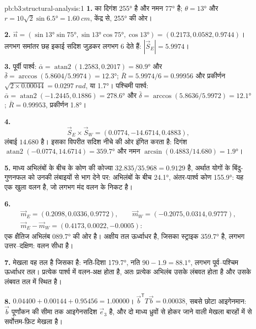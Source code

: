 \begin{solution}{pb:b3:structural-analysis:1}
\textbf{1.}  का दिगंश \ang{255} है और नमन \ang{77} है; $\theta =
\ang{13}$ और $r = 10\sqrt2\sin\ang{6.5} = \qty{1.60}{cm}$, केंद्र से,
\ang{255} की ओर।

\textbf{2.} $\vec n = (\sin\ang{13}\sin\ang{75}, \sin\ang{13}\cos\ang{75},
\cos\ang{13}) = (0.2173, 0.0582, 0.9744)$। लगभग समांतर छह इकाई सदिश
जुड़कर लगभग 6 देते हैं: $|\vec S_E| = 5.9974$।

\textbf{3.} पूर्वी पार्श्व: $\bar\alpha = \operatorname{atan2}(1.2583, 0.2017) =
\ang{80.9}$ और $\bar\delta = \arccos(5.8604/5.9974) = \ang{12.3}$; $\bar R
= 5.9974/6 = 0.99956$ और प्रकीर्णन $\sqrt{2\times0.00044} =
\qty{0.0297}{rad}$, या \ang{1.7}। पश्चिमी पार्श्व: $\bar\alpha =
\operatorname{atan2}(-1.2445, 0.1886) = \ang{278.6}$ और $\bar\delta =
\arccos(5.8636/5.9972) = \ang{12.1}$; $\bar R = 0.99953$, प्रकीर्णन \ang{1.8}।

\textbf{4.}
\[
  \vec S_E\times\vec S_W = (0.0774, -14.6714, 0.4883),
\]
 लंबाई $14.680$ है। इसका विपरीत सदिश नीचे की ओर इंगित करता है: दिगंश $\operatorname{atan2}(-0.0774, 14.6714) = \ang{359.7}$ और
 नमन $\arcsin(0.4883/14.680) = \ang{1.9}$।

\textbf{5.} माध्य अभिलंबों के बीच के कोण की कोज्या
$32.835/35.968 = 0.9129$ है, अर्थात योगों के बिंदु-गुणनफल को उनकी
लंबाइयों से भाग देने पर: अभिलंबों के बीच \ang{24.1}, अंतर-पार्श्व कोण \ang{155.9}:
यह एक खुला वलन है, जो लगभग मंद वलन के निकट है।

\textbf{6.}
\begin{gather*}
  \vec m_E = (0.2098, 0.0336, 0.9772),\qquad \vec m_W = (-0.2075, 0.0314, 0.9777),\\
  \vec m_E - \vec m_W = (0.4173, 0.0022, -0.0005):
\end{gather*}
एक क्षैतिज अभिलंब \ang{089.7} की ओर है। अक्षीय तल ऊर्ध्वाधर है, जिसका स्ट्राइक
\ang{359.7} है, लगभग उत्तर--दक्षिण: वलन सीधा है।

\textbf{7.} मेखला वह तल है जिसका   है: नति-दिशा
\ang{179.7}, नति $90 - 1.9 = \ang{88.1}$, लगभग पूर्व--पश्चिम ऊर्ध्वाधर
तल। प्रत्येक पार्श्व में वलन-अक्ष होता है, अतः प्रत्येक अभिलंब उसके
लंबवत होता है और उसके लंबवत तल में स्थित है।

\textbf{8.} $0.04400 + 0.00144 + 0.95456 = 1.00000$। $\vec b^{\mathsf T}T\vec
b = 0.00038$, सबसे छोटा आइगेनमान: $\vec b$ पूर्णांकन की सीमा तक
आइगेनसदिश $\vec e_3$ है, और दो माध्य ध्रुवों से होकर जाने वाली मेखला
बारहों में से सर्वोत्तम-फ़िट मेखला है।


\end{solution}
